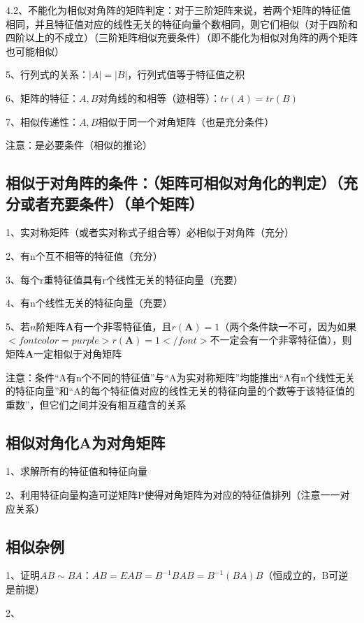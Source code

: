 4.2、不能化为相似对角阵的矩阵判定：对于三阶矩阵来说，若两个矩阵的特征值相同，并且特征值对应的线性无关的特征向量个数相同，则它们相似（对于四阶和四阶以上的不成立）（三阶矩阵相似充要条件）（即不能化为相似对角阵的两个矩阵也可能相似）

5、行列式的关系：$ |A|=|B| $，行列式值等于特征值之积

6、矩阵的特征：$ A,B $对角线的和相等（迹相等）：$ tr(A)=tr(B) $

7、相似传递性：$ A,B $相似于同一个对角矩阵（也是充分条件）

注意：是必要条件（相似的推论）



\subsection{相似于对角阵的条件：（矩阵可相似对角化的判定）（充分或者充要条件）（单个矩阵）}

1、实对称矩阵（或者实对称式子组合等）必相似于对角阵（充分）

2、有n个互不相等的特征值（充分）

3、每个r重特征值具有r个线性无关的特征向量（充要）

4、有n个线性无关的特征向量（充要）

5、若$ n $阶矩阵$ \boldsymbol{A} $有一个非零特征值，且$ r(\boldsymbol{A})=1 $（两个条件缺一不可，因为如果$ <font color=purple>r(\boldsymbol{A})=1</font> $不一定会有一个非零特征值），则矩阵$ \boldsymbol{A} $一定相似于对角矩阵

注意：条件“A有n个不同的特征值”与“A为实对称矩阵”均能推出“A有n个线性无关的特征向量”和“A的每个特征值对应的线性无关的特征向量的个数等于该特征值的重数”，但它们之间并没有相互蕴含的关系



\subsection{相似对角化A为对角矩阵}

1、求解所有的特征值和特征向量

2、利用特征向量构造可逆矩阵P使得对角矩阵为对应的特征值排列（注意一一对应关系）



\subsection{相似杂例}

1、证明$ AB \sim BA $：$ AB = EAB = B^{-1}BAB = B^{-1}(BA)B $（恒成立的，B可逆是前提）

2、

